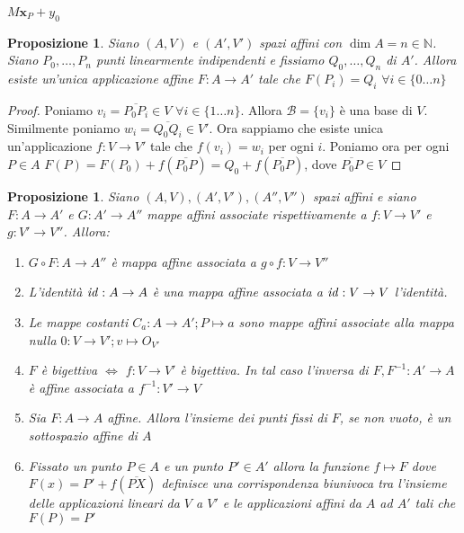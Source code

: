 \documentclass{article}
\newcounter{theo}[section]\setcounter{theo}{0}
\theoremstyle{plain}
\newtheorem{proposition}[theo]{Proposizione}
\theoremstyle{definition}
\theoremstyle{remark}
\begin{document}
\(M\mathbf{x}_P + y_{0}\) 
\begin{proposition}
    Siano \((A, V)\) e \((A', V')\) spazi affini con \(\dim A = n \in
    \mathbb{N}\). Siano \(P_{0}, \dots, P_n\) punti linearmente indipendenti e
    fissiamo \(Q_{0}, \dots, Q_n\) di \(A'\). Allora esiste un'unica
    applicazione affine \(F: A \to A'\) tale che \(F(P_i) = Q_i\,\,\forall i \in
    \{0\dots n\} \) 
\end{proposition}
\begin{proof}
    Poniamo \(v_{i} = \overline{P_{0} P_{i}} \in V\,\,\forall i \in \{1\dots n\}
    \). Allora \(\mathcal{B} = \{v_{i}\} \) è una base di \(V\). Similmente
    poniamo \(w_{i} = \overline{Q_{0}Q_{i}} \in V'\). Ora sappiamo che esiste
    unica un'applicazione \(f:V\to V'\) tale che \(f(v_{i}) = w_{i}\) per ogni
    \(i\). Poniamo ora per ogni \(P \in A\) \(F(P) = F(P_{0}) +
    f(\overline{P_{0} P}) = Q_{0} + f(\overline{P_{0} P})\), dove
    \(\overline{P_{0} P} \in V\) 
\end{proof}
\begin{proposition}
    Siano \((A, V), (A', V'), (A'', V'')\) spazi affini e siano \(F: A \to A'\)
    e \(G: A' \to  A''\) mappe affini associate rispettivamente a \(f: V \to
    V'\) e \(g : V' \to  V''\). Allora:
\begin{enumerate}[label = \arabic*.]
    \item \(G\circ F : A \to  A''\) è mappa affine associata a \(g \circ f : V
        \to V''\) 
    \item L'identità \(\text{\emph{id}}: A \to  A\) è una mappa affine associata a
        \(\text{\emph{id}}: V \to
        V\) l'identità.
    \item Le mappe costanti \(C_a : A \to  A' ; P \mapsto a\) sono mappe affini
        associate alla mappa nulla \(0: V \to V' ; v \mapsto O_{V'}\) 
    \item \(F\) è bigettiva \(\iff\) \(f: V \to V'\) è bigettiva. In tal caso
        l'inversa di \(F, F^{-1}: A' \to A\) è affine associata a \(f^{-1}: V'
        \to V\) 
    \item Sia \(F: A \to A\) affine. Allora l'insieme dei punti fissi di \(F\),
        se non vuoto, è un sottospazio affine di \(A\)
    \item Fissato un punto \(P \in A\) e un punto \(P' \in  A'\) allora la
        funzione \(f \mapsto F \) dove \(F(x) = P' + f(\overline{PX})\)
        definisce una corrispondenza biunivoca tra l'insieme delle applicazioni
        lineari da \(V\) a \(V'\) e le applicazioni affini da \(A\) ad \(A'\)
        tali che \(F(P) = P'\) 
\end{enumerate}
\end{proposition}
\end{document}
